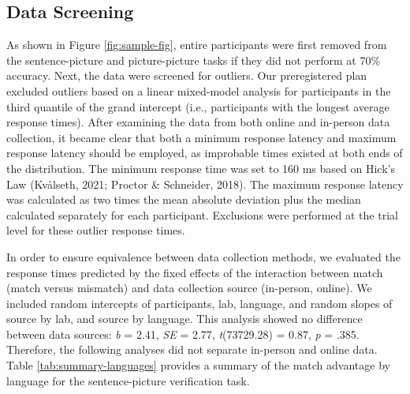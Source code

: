 \documentclass[
  man,floatsintext]{apa7}
\begin{document}
\hypertarget{data-screening}{%
\subsection{Data Screening}\label{data-screening}}

As shown in Figure \ref{fig:sample-fig}, entire participants were first
removed from the sentence-picture and picture-picture tasks if they did
not perform at 70\% accuracy. Next, the data were screened for outliers.
Our preregistered plan excluded outliers based on a linear mixed-model
analysis for participants in the third quantile of the grand intercept
(i.e., participants with the longest average response times). After
examining the data from both online and in-person data collection, it
became clear that both a minimum response latency and maximum response
latency should be employed, as improbable times existed at both ends of
the distribution. The minimum response time was set to 160 ms based on
Hick's Law (Kvålseth, 2021; Proctor \& Schneider, 2018).
The maximum response latency was calculated as two times the mean
absolute deviation plus the median calculated separately for each
participant. Exclusions were performed at the trial level for these
outlier response times.

In order to ensure equivalence between data collection methods, we
evaluated the response times predicted by the fixed effects of the
interaction between match (match versus mismatch) and data collection
source (in-person, online). We included random intercepts of
participants, lab, language, and random slopes of source by lab, and
source by language. This analysis showed no difference between data
sources: \emph{b} =
2.41,
\emph{SE} =
2.77,
\emph{t}(73729.28)
=
0.87,
\emph{p} = .385. Therefore, the
following analyses did not separate in-person and online data. Table
\ref{tab:summary-languages} provides a summary of the match advantage
by language for the sentence-picture verification task.
\end{document}
